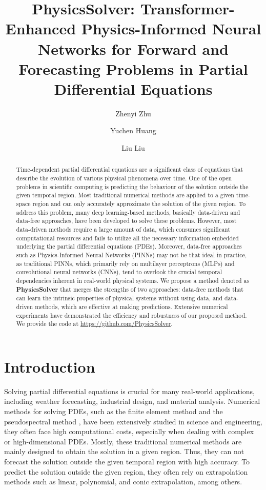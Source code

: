 \documentclass[preprint,11pt]{elsarticle}
\begin{document}
\begin{frontmatter}
\author{Zhenyi Zhu}
\author{Yuchen Huang}
\author{Liu Liu}
\address{Department of Mathematics, The Chinese University of Hong Kong}
\title{PhysicsSolver: Transformer-Enhanced Physics-Informed Neural Networks for Forward and Forecasting Problems in Partial Differential Equations}
\begin{abstract}
Time-dependent partial differential equations are a significant class of equations that describe the evolution of various physical phenomena over time. One of the open problems in scientific computing is predicting the behaviour of the solution outside the given temporal region. Most traditional numerical methods are applied to a given time-space region and can only accurately approximate the solution of the given region. To address this problem, many deep learning-based methods, basically data-driven and data-free approaches, have been developed to solve these problems. However, most data-driven methods require a large amount of data, which consumes significant computational resources and fails to utilize all the necessary information embedded underlying the partial differential equations (PDEs). Moreover, data-free approaches such as Physics-Informed Neural Networks (PINNs) may not be that ideal in practice, as traditional PINNs, which primarily rely on multilayer perceptrons (MLPs) and convolutional neural networks (CNNs), tend to overlook the crucial temporal dependencies inherent in real-world physical systems. We propose a method denoted as \textbf{PhysicsSolver} that merges the strengths of two approaches: data-free methods that can learn the intrinsic properties of physical systems without using data, and data-driven methods, which are effective at making predictions. 
Extensive numerical experiments have demonstrated the efficiency and robustness of our proposed method. We provide the code at \href{https://github.com/PhysicsSolver/PhysicsSolver}{https://github.com/PhysicsSolver}.
\end{abstract}
\end{frontmatter}

\section{Introduction}

Solving partial differential equations is crucial for many real-world applications, including weather forecasting, industrial design, and material analysis. Numerical methods for solving PDEs, such as the finite element method \cite{bathe2006finite} and the pseudospectral method \cite{fornberg1998practical}, have been extensively studied in science and engineering, they often face high computational costs, especially when dealing with complex or high-dimensional PDEs. Mostly, these traditional numerical methods are mainly designed to obtain the solution in a given region. Thus, they can not forecast the solution outside the given temporal region with high accuracy. To predict the solution outside the given region, they often rely on extrapolation methods \cite{sidi2003practical} such as linear, polynomial, and conic extrapolation, among others.
\end{document}
